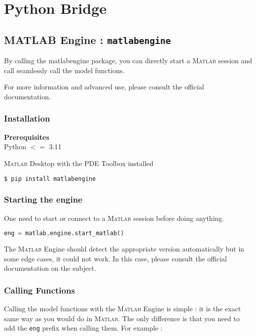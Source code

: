 \section{Python Bridge}

\subsection{MATLAB Engine : {\tt matlabengine}}

By calling the matlabengine package, you can directly start a \textsc{Matlab} session and call seamlessly call the model functions.

For more information and advanced use, please consult the official documentation.

\subsubsection{Installation}

\textbf{Prerequisites}\\

Python $<=$ 3.11

\textsc{Matlab} Desktop with the PDE Toolbox installed

\begin{lstlisting}[language=sh]
$ pip install matlabengine
\end{lstlisting}

\subsubsection{Starting the engine}

One need to start or connect to a \textsc{Matlab} session before doing anything.

\begin{lstlisting}[language=Python]
eng = matlab.engine.start_matlab()
\end{lstlisting}

The \textsc{Matlab} Engine should detect the appropriate version automatically but in some edge cases, it could not work. In this case, please consult the official documentation on the subject.

\subsubsection{Calling Functions}

Calling the model functions with the \textsc{Matlab} Engine is simple : it is the exact same way as you would do in \textsc{Matlab}. The only difference is that you need to add the {\tt eng} prefix when calling them. For example :


